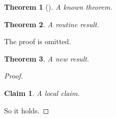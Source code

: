 \documentclass{article}
\newtheorem{theorem}{Theorem}
\newtheorem*{claim}{Claim}
\begin{document}
\begin{theorem}[{\cite[Theorem 4.1]{Rudin}}]
A known theorem.
\end{theorem}
\begin{theorem}
A routine result.
\end{theorem}
The proof is omitted.

\begin{theorem}
A new result.
\end{theorem}
\begin{proof}
\begin{claim}
A local claim.
\end{claim}
So it holds.
\end{proof}
\end{document}

